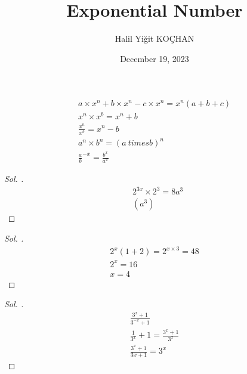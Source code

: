 \documentclass{article}
\title{Exponential Number}
\author{Halil Yiğit KOÇHAN}
\date{December 19, 2023}
\theoremstyle{mytheoremstyle}
\theoremstyle{mytheoremstyle}
\theoremstyle{myproblemstyle}
\begin{document}
    \maketitle

\begin{gather*}
  a \times x^n + b \times x^n - c \times x^n = x^n(a + b + c)\\
  x^n \times x^b = x^n + b\\
  \frac{x^n}{x^b} = x^n - b\\
  a^n \times b^n = (a \ times b)^n\\
  \frac{a}{b}^{-x} = \frac{b^x}{a^x}
\end{gather*}

\begin{problem}[$ 2x = a $ ise $ 8^x + 1 $'in $ a $ cinsinden eşiti?]
\end{problem}

\begin{proof}[\textit{ Sol. }]
  \begin{align*}
    &2^{3x} \times 2^3 = 8a^3\\
    &(a^3)
  \end{align*}
\end{proof}

\begin{problem}[$ 2^x + 2^{x+1} = 48 $ ise $ x = ? $]
\end{problem}

\begin{proof}[\textit{ Sol. }]
  \begin{gather*}
    2^x(1 + 2) = 2^{x \times 3} = 48\\
    2^x = 16\\
    x = 4
  \end{gather*}
\end{proof}

\begin{problem}[$ a = 3^x + 1 $, $ b = 3^{-x} + 1 $ ise $ \frac{a}{b} = ? $]
\end{problem}

\begin{proof}[\textit{ Sol. }]
  \begin{gather*}
    \frac{3^x + 1}{3^{-x} + 1}\\
    \frac{1}{3^x} + 1 = \frac{3^x + 1}{3^x}\\
    \frac{3^x + 1}{3x + 1} = 3^x
  \end{gather*}
\end{proof}

\begin{problem}[$ 2^{x - 1} = 5 $ ise $ 0,5^2{x+1} = ? $]
\end{problem}
\end{document}
